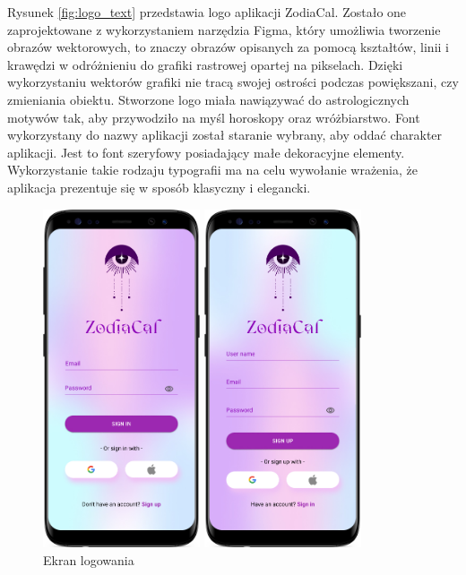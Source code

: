 Rysunek \ref{fig:logo_text} przedstawia logo aplikacji ZodiaCal. Zostało one zaprojektowane z wykorzystaniem narzędzia Figma, który umożliwia tworzenie obrazów wektorowych, to znaczy obrazów opisanych za pomocą kształtów, linii i krawędzi w odróżnieniu do grafiki rastrowej opartej na pikselach. Dzięki wykorzystaniu wektorów grafiki nie tracą swojej ostrości
podczas powiększani, czy zmieniania obiektu. Stworzone logo miała nawiązywać do astrologicznych motywów tak, aby przywodziło na myśl horoskopy oraz wróżbiarstwo. Font wykorzystany do nazwy aplikacji został staranie wybrany, aby oddać charakter aplikacji. Jest to
font szeryfowy posiadający małe dekoracyjne elementy. Wykorzystanie takie rodzaju typografii ma na celu wywołanie wrażenia, że aplikacja prezentuje się w sposób klasyczny i elegancki.


\begin{figure}[t]
	\begin{minipage}{0.4\textwidth}
		\centering
		\includegraphics[height=10cm, keepaspectratio]{images/interfejs_figma/Sign_in}
		\caption{Ekran logowania}
		\label{fig:Sign-in}
	\end{minipage}
	\hfill
	\begin{minipage}{0.4\textwidth}
		\centering
		\includegraphics[height=10cm,           keepaspectratio]{images/interfejs_figma/Sign_up}

\end{minipage}
\end{figure}
